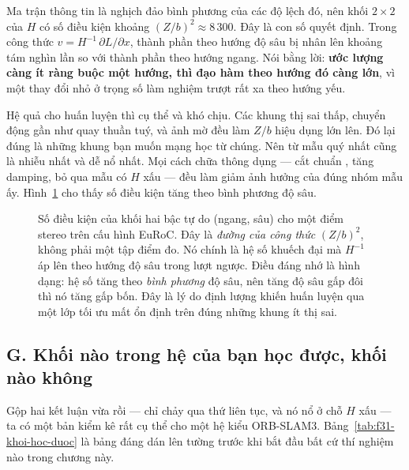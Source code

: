 \documentclass[../../deep_learning.tex]{subfiles}
\begin{document}
Ma trận thông tin là nghịch đảo bình phương của các độ lệch đó, nên khối \(2\times2\) của \(H\) có số điều kiện khoảng \((Z/b)^2 \approx 8\,300\). Đây là con số quyết định. Trong công thức \(v = H^{-1}\,\partial L/\partial x\), thành phần  theo hướng độ sâu bị nhân lên khoảng tám nghìn lần so với thành phần theo hướng ngang. Nói bằng lời: \textbf{ước lượng càng ít ràng buộc một hướng, thì đạo hàm theo hướng đó càng lớn}, vì một thay đổi nhỏ ở trọng số làm nghiệm trượt rất xa theo hướng yếu.

Hệ quả cho huấn luyện thì cụ thể và khó chịu. Các khung thị sai thấp, chuyển động gần như quay thuần tuý, và ảnh mờ đều làm \(Z/b\) hiệu dụng lớn lên. Đó lại đúng là những khung bạn muốn mạng học từ chúng. Nên  từ mẫu quý nhất cũng là  nhiễu nhất và dễ nổ nhất. Mọi cách chữa thông dụng --- cắt chuẩn , tăng damping, bỏ qua mẫu có \(H\) xấu --- đều làm giảm ảnh hưởng của đúng nhóm mẫu ấy. Hình~\ref{fig:f31-so-dieu-kien} cho thấy số điều kiện tăng theo bình phương độ sâu.

\begin{figure}[H]\centering
{}
\caption{Số điều kiện của khối hai bậc tự do (ngang, sâu) cho một điểm stereo trên cấu hình EuRoC. Đây là \emph{đường của công thức} \((Z/b)^2\), không phải một tập điểm đo. Nó chính là hệ số khuếch đại mà \(H^{-1}\) áp lên  theo hướng độ sâu trong lượt ngược. Điều đáng nhớ là hình dạng: hệ số tăng theo \emph{bình phương} độ sâu, nên tăng độ sâu gấp đôi thì nó tăng gấp bốn. Đây là lý do định lượng khiến huấn luyện qua một lớp tối ưu mất ổn định trên đúng những khung ít thị sai.}
\label{fig:f31-so-dieu-kien}
\end{figure}

\subsection{G. Khối nào trong hệ của bạn học được, khối nào không}
Gộp hai kết luận vừa rồi ---  chỉ chảy qua thứ liên tục, và nó nổ ở chỗ \(H\) xấu --- ta có một bản kiểm kê rất cụ thể cho một hệ kiểu ORB-SLAM3. Bảng~\ref{tab:f31-khoi-hoc-duoc} là bảng đáng dán lên tường trước khi bắt đầu bất cứ thí nghiệm nào trong chương này.
\end{document}
